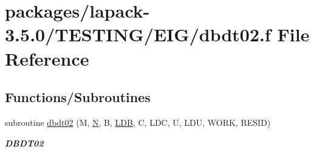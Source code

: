 \hypertarget{dbdt02_8f}{}\section{packages/lapack-\/3.5.0/\+T\+E\+S\+T\+I\+N\+G/\+E\+I\+G/dbdt02.f File Reference}
\label{dbdt02_8f}
\subsection*{Functions/\+Subroutines}
\begin{DoxyCompactItemize}
\item 
subroutine \hyperlink{group__double__eig_ga4300a964c1dd20239562d1c58a1c8a69}{dbdt02} (M, \hyperlink{polmisc_8c_a0240ac851181b84ac374872dc5434ee4}{N}, B, \hyperlink{example__user_8c_a50e90a7104df172b5a89a06c47fcca04}{L\+D\+B}, C, L\+D\+C, U, L\+D\+U, W\+O\+R\+K, R\+E\+S\+I\+D)
\begin{DoxyCompactList}\small\item\em {\bfseries D\+B\+D\+T02} \end{DoxyCompactList}\end{DoxyCompactItemize}
